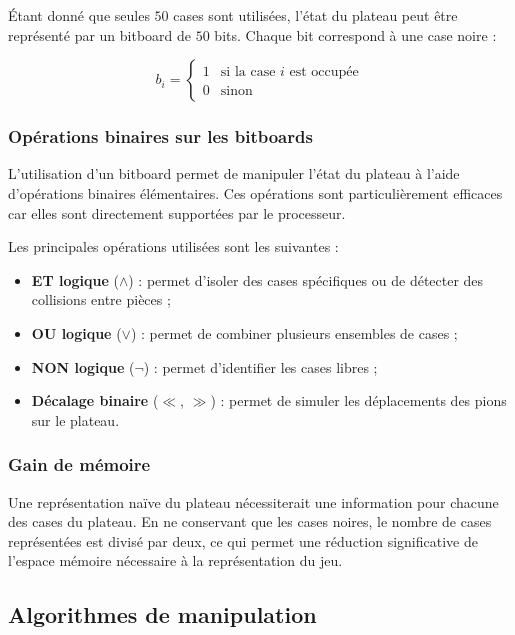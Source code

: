 \documentclass[11pt,a4paper]{article}
\begin{document}
Étant donné que seules \(50\) cases sont utilisées, l'état du
plateau peut être représenté par un bitboard de \(50\) bits.
Chaque bit correspond à une case noire :

\[
b_i =
\begin{cases}
1 & \text{si la case } i \text{ est occupée} \\
0 & \text{sinon}
\end{cases}
\]

\subsubsection{Opérations binaires sur les bitboards}

L'utilisation d'un bitboard permet de manipuler l'état du plateau
à l'aide d'opérations binaires élémentaires.
Ces opérations sont particulièrement efficaces car elles sont
directement supportées par le processeur.

Les principales opérations utilisées sont les suivantes :
\begin{itemize}
  \item \textbf{ET logique} (\(\land\)) : permet d'isoler des cases
  spécifiques ou de détecter des collisions entre pièces ;
  \item \textbf{OU logique} (\(\lor\)) : permet de combiner plusieurs
  ensembles de cases ;
  \item \textbf{NON logique} (\(\lnot\)) : permet d'identifier les cases
  libres ;
  \item \textbf{Décalage binaire} (\(\ll\), \(\gg\)) : permet de simuler
  les déplacements des pions sur le plateau.
\end{itemize}


\subsubsection{Gain de mémoire}

Une représentation naïve du plateau nécessiterait une information
pour chacune des cases du plateau. En ne conservant que les cases
noires, le nombre de cases représentées est divisé par deux,
ce qui permet une réduction significative de l'espace mémoire
nécessaire à la représentation du jeu.




\subsection{Algorithmes de manipulation}
\end{document}
